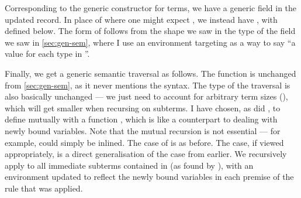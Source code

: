
Corresponding to the generic  constructor for
terms, we have a generic field  in the
updated  record.
In place of where one might expect
\AgdaSpace{}\AgdaBound{$\C$}, we instead have
\AgdaSpace{}\AgdaBound{$\V$}\AgdaSpace{}\AgdaBound{$\C$},
with  defined below.
The form of  follows from the shape we saw in the type of
the  field we saw in \cref{sec:gen-sem},
where I use an environment targeting \AgdaBound{$\Delta$} as a way to say
``a value for each type in \AgdaBound{$\Delta$}''.


Finally, we get a generic semantic traversal as follows.
The function  is unchanged from \cref{sec:gen-sem}, as it
never mentions the syntax.
The type of the traversal  is also basically unchanged --- we
just need to account for arbitrary term sizes (), which will get
smaller when recursing on subterms.
I have chosen, as did \citet{AACMM21}, to define  mutually
with a function , which is like a counterpart to
 dealing with newly bound variables.
Note that the mutual recursion is not essential --- for example,
 could simply be inlined.
The  case of  is as before.
The  case, if viewed appropriately, is a direct
generalisation of the  case from earlier.
We recursively apply  to all immediate subterms contained in
 (as found by ), with an environment updated to
reflect the newly bound variables in each premise of the rule that was applied.

